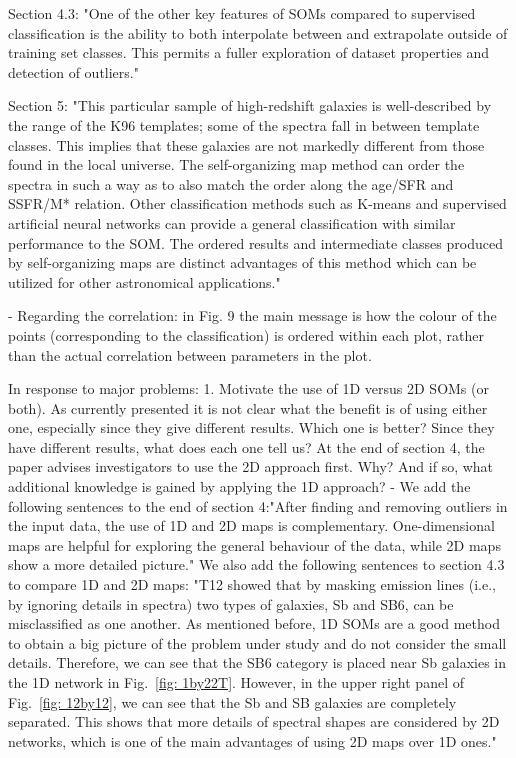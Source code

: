 	    Section 4.3: 
	    "One of the other key features of SOMs compared to supervised classification is the ability to both interpolate between and extrapolate outside of training set classes.
        This permits a fuller exploration of dataset properties and detection of outliers."
 	    
 
	    Section 5:
        "This particular sample of high-redshift galaxies is well-described by the range of the K96 templates; some of the spectra fall in between template classes.  This implies that these galaxies are not markedly different from those found in the local universe. The self-organizing map method can order the spectra in such a way as to also match the order along the age/SFR and SSFR/M* relation.
     Other classification methods such as K-means and supervised artificial neural networks can provide a general classification with similar performance to the SOM. The ordered results and intermediate classes produced by self-organizing maps are distinct advantages of this method which can be utilized for other astronomical applications."

        - Regarding the correlation: in Fig. 9 the main message is how the colour of the points (corresponding to the classification) is ordered within each plot, rather than the actual correlation between parameters in the plot.

In response to major problems:
1.	Motivate the use of 1D versus 2D SOMs (or both).  As currently presented it is not clear what the benefit is of using either one, especially since they give different results.  Which one is better? Since they have different results, what does each one tell us?  At the end of section 4, the paper advises investigators to use the 2D approach first.  Why?  And if so, what additional knowledge is gained by applying the 1D approach? 
	- We add the following sentences to the end of section 4:"After finding and removing outliers in the input data, the use of 1D and 2D maps is complementary. One-dimensional maps are helpful for exploring the general behaviour of the data, while 2D maps show a more detailed picture."
	We also add the following sentences to section 4.3 to compare 1D and 2D maps:
    	"T12 showed that by masking emission lines (i.e., by ignoring details in spectra) two types of galaxies, Sb and SB6, can be misclassified as one another.
        As mentioned before, 1D SOMs are a good method to obtain a big picture of the problem under study and do not consider the small details. 
        Therefore, we can see that the SB6 category is placed near Sb galaxies in the 1D network in Fig.~\ref{fig: 1by22T}.
        However, in the upper right panel of Fig.~\ref{fig: 12by12}, we can see that the Sb and SB galaxies are completely separated. This shows that more details of spectral shapes are considered by 2D networks, which is one of the main advantages of  using 2D maps over 1D ones."

